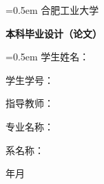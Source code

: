 \begin{titlepage}
\centering

{
\parskip=0.5em
\linespread{1.25}
\LARGE \heiti
合\hspace{1.5em}肥\hspace{1.5em}工\hspace{1.5em}业\hspace{1.5em}大\hspace{1.5em}学\vspace{2.95cm}

\bfseries{本科毕业设计（论文）}\vspace{2cm}

\songti \bfseries{\titleCn} \vspace{6cm}
}

{
\parskip=0.5em \linespread{1.5}
\songti \sanhao
学生姓名：\underlineFixlen[8.8cm]{\studentNameCn}

学生学号：\underlineFixlen[8.8cm]{\studentID}

指导教师：\underlineFixlen[8.8cm]{\supervisor}

专业名称：\underlineFixlen[8.8cm]{\major}

系名称\hspace{1em}：\underlineFixlen[8.8cm]{\department}

\vspace{3.2cm}
\large
\finishedYear 年\finishedMonth 月
}


\end{titlepage}
